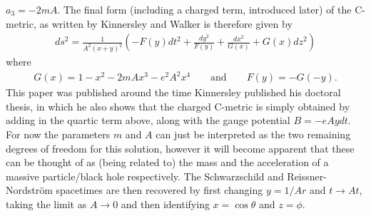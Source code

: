 \documentclass[
twoside,
openright,
frontopenright,
]{dmathesis}
\begin{document}
$a_3 = -2 m A$. The final form (including a charged term, introduced later) of
the C-metric, as written by Kinnersley and Walker is therefore given by
\begin{align}
  \label{eq:kinnersley-walker-metric}
  ds^2 = \frac{1}{A^2(x+y)^2} \left(-F(y)dt^2 + \frac{dy^2}{F(y)} +
  \frac{dx^2}{G(x)} + G(x) dz^2\right)
\end{align}
where
\begin{align}
  G(x) = 1-x^2-2mAx^3-e^2 A^2 x^4\qquad \mbox{and} \qquad F(y) = -G(-y).
\end{align}
This paper was published around the time Kinnersley published his doctoral
thesis, in which he also shows that the charged C-metric is simply obtained by
adding in the quartic term above, along with the gauge potential $B = -eAydt$.
For now the parameters $m$ and $A$ can just be interpreted as the two remaining
degrees of freedom for this solution, however it will become apparent that these
can be thought of as (being related to) the mass and the acceleration of a
massive particle/black hole respectively. The Schwarzschild and
Reissner-Nordstr\"om spacetimes are then recovered by first changing $y = 1/Ar$
and $t\to At$, taking the limit as $A \to 0$ and then identifying
$x = \cos\theta$ and $z = \phi$.
\end{document}
